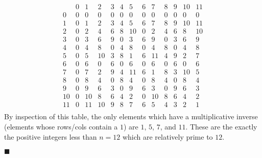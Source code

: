 \documentclass[12pt]{article}
\renewcommand{\qed}{\hfill$\blacksquare$}
\renewenvironment{proof}{\begin{addmargin}[1em]{0em}\begin{newproof}}{\end{newproof}\end{addmargin}\qed}
\begin{document}
\begin{proof}
\begin{equation}
\begin{array}{c|cccccccccccc}
& 0 & 1 & 2 & 3 & 4 & 5 & 6 & 7 & 8 & 9 & 10 & 11 \\ \hline
0 & 0 & 0 & 0 & 0 & 0 & 0 & 0 & 0 & 0 & 0 & 0 & 0 \\
1 & 0 & 1 & 2 & 3 & 4 & 5 & 6 & 7 & 8 & 9 & 10 & 11 \\
2 & 0 & 2 & 4 & 6 & 8 & 10 & 0 & 2 & 4 & 6 & 8 & 10 \\
3 & 0 & 3 & 6 & 9 & 0 & 3 & 6 & 9 & 0 & 3 & 6 & 9 \\
4 & 0 & 4 & 8 & 0 & 4 & 8  & 0 & 4 & 8 & 0 &4 &8 \\
5 & 0 & 5 & 10 & 3 & 8 & 1 & 6 & 11 & 4 & 9 & 2 & 7 \\
6 & 0 & 6 & 0 & 6 & 0 & 6 & 0 & 6 & 0 & 6 & 0 & 6 \\
7 & 0 & 7 & 2 & 9 & 4 & 11 & 6 & 1 & 8 & 3 & 10 & 5 \\
8 & 0 & 8 & 4 & 0 & 8 & 4 & 0 & 8  & 4 & 0 & 8 & 4 \\
9 & 0 & 9 & 6 & 3 & 0 & 9 & 6 & 3 & 0  & 9 & 6  & 3 \\
10 & 0 & 10 & 8 & 6 & 4 & 2 & 0 & 10 & 8 & 6 & 4 &2  \\
11 & 0 & 11 & 10 & 9 & 8 & 7 & 6 & 5 &4  &3 &2 &1 \\
\end{array}
\end{equation}
By inspection of this table, the only elements which have a multiplicative inverse (elements whose rows/cols contain a $1$) are $1$, $5$, $7$, and $11$. These are the exactly the positive integers less than $n=12$ which are relatively prime to $12$.
\end{proof}
\end{document}
